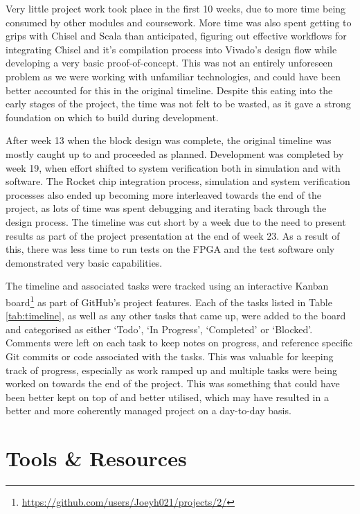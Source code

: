 Very little project work took place in the first 10 weeks, due to more time being consumed by other modules and coursework. More time was also spent getting to grips with Chisel and Scala than anticipated, figuring out effective workflows for integrating Chisel and it's compilation process into Vivado's design flow while developing a very basic proof-of-concept. This was not an entirely unforeseen problem as we were working with unfamiliar technologies, and could have been better accounted for this in the original timeline. Despite this eating into the early stages of the project, the time was not felt to be wasted, as it gave a strong foundation on which to build during development.

After week 13 when the block design was complete, the original timeline was mostly caught up to and proceeded as planned. Development was completed by week 19, when effort shifted to system verification both in simulation and with software. The Rocket chip integration process, simulation and system verification processes also ended up becoming more interleaved towards the end of the project, as lots of time was spent debugging and iterating back through the design process. The timeline was cut short by a week due to the need to present results as part of the project presentation at the end of week 23. As a result of this, there was less time to run tests on the FPGA and the test software only demonstrated very basic capabilities.

The timeline and associated tasks were tracked using an interactive Kanban board\footnote{\url{https://github.com/users/Joeyh021/projects/2/}} as part of GitHub's project features. Each of the tasks listed in Table \ref{tab:timeline}, as well as any other tasks that came up, were added to the board and categorised as either `Todo', `In Progress', `Completed' or `Blocked'. Comments were left on each task to keep notes on progress, and reference specific Git commits or code associated with the tasks. This was valuable for keeping track of progress, especially as work ramped up and multiple tasks were being worked on towards the end of the project. This was something that could have been better kept on top of and better utilised, which may have resulted in a better and more coherently managed project on a day-to-day basis.

\section{Tools \& Resources}


